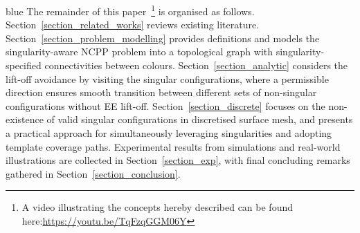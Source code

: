 \documentclass[Afour,sageh,times]{sagej}
\begin{document}
\begin{color}{blue}
The remainder of this paper~\footnote{A video illustrating the concepts hereby described can be found 
here:\url{https://youtu.be/TqFzqGGM06Y}} is organised as follows. 
Section~\ref{section_related_works} reviews existing literature. 
Section~\ref{section_problem_modelling} provides definitions and models the singularity-aware NCPP problem into a topological graph with singularity-specified connectivities between colours. 
Section~\ref{section_analytic} considers the lift-off avoidance by visiting the singular configurations, where a permissible direction ensures smooth transition between different sets of non-singular configurations without EE lift-off.
Section~\ref{section_discrete} focuses on the non-existence of valid singular configurations in discretised surface mesh, and presents a practical approach for simultaneously leveraging singularities and adopting template coverage paths. 
Experimental results from simulations and real-world illustrations are collected in Section~\ref{section_exp}, with final concluding remarks gathered in 
Section~\ref{section_conclusion}.
\end{color}
\end{document}
